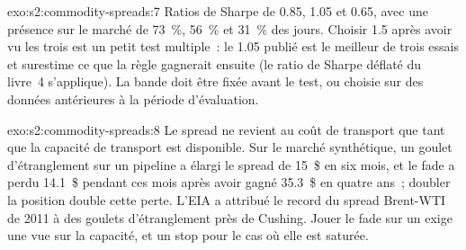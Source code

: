 \begin{solution}{exo:s2:commodity-spreads:7}
Ratios de Sharpe de 0.85, 1.05 et 0.65, avec une présence sur le marché de 73~\%, 56~\% et 31~\% des jours. Choisir 1.5 après avoir vu les trois est un petit test multiple~:
le 1.05 publié est le meilleur de trois essais et surestime ce que la règle gagnerait ensuite (le ratio de Sharpe déflaté du livre~4 s'applique). La bande doit
être fixée avant le test, ou choisie sur des données antérieures à la période d'évaluation.
\end{solution}

\begin{solution}{exo:s2:commodity-spreads:8}
Le spread ne revient au coût de transport que tant que la capacité de transport est disponible. Sur le marché synthétique, un goulet d'étranglement sur un pipeline a élargi le spread de
15~\$ en six mois, et le fade a perdu 14.1~\$ pendant ces mois après avoir gagné 35.3~\$ en quatre ans~; doubler la position double cette perte.
L'EIA a attribué le record du spread Brent-WTI de 2011 à des goulets d'étranglement près de Cushing. Jouer le fade sur un  exige une vue sur la capacité, et un stop
pour le cas où elle est saturée.
\end{solution}

